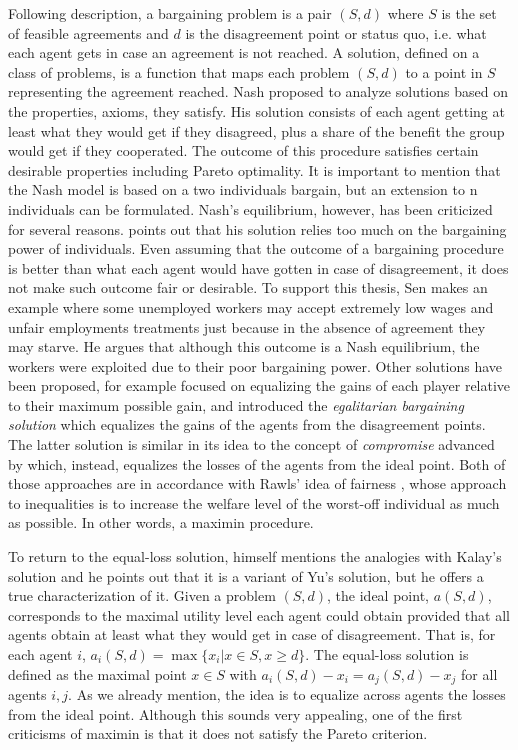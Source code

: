 Following \citet{Nash1950} description, a bargaining problem is a pair $(S,d)$ where $S$ is the set of feasible agreements and $d$ is the disagreement point or status quo, i.e. what each agent gets in case an agreement is not reached. A solution, defined on a class of problems, is a function that maps each problem $(S,d)$ to a point in $S$ representing the agreement reached.
Nash proposed to analyze solutions based on the properties, axioms, they satisfy. His solution consists of each agent getting at least what they would get if they disagreed, plus a share of the benefit the group would get if they cooperated. The outcome of this procedure satisfies certain desirable properties including Pareto optimality. It is important to mention that the Nash model is based on a two individuals bargain, but an extension to n individuals can be formulated. Nash's equilibrium, however, has been criticized for several reasons. \citet[177-180]{Sen2017} points out that his solution relies too much on the bargaining power of individuals.
Even assuming that the outcome of a bargaining procedure is better than what each agent would have gotten in case of disagreement, it does not make such outcome fair or desirable. To support this thesis, Sen makes an example where some unemployed workers may accept extremely low wages and unfair employments treatments just because in the absence of agreement they may starve. He argues that although this outcome is a Nash equilibrium, the workers were exploited due to their poor bargaining power.
Other solutions have been proposed, for example \citet{Kalai1975} focused on equalizing the gains of each player relative to their maximum possible gain, and \citet{Kalai1977} introduced the \textit{egalitarian bargaining solution} which equalizes the gains of the agents from the disagreement points. 
The latter solution is similar in its idea to the concept of \textit{compromise} advanced by \citet{Yu1973} which, instead, equalizes the losses of the agents from the ideal point.
Both of those approaches are in accordance with Rawls' idea of fairness \citep{Rawls1958,Rawls1967}, whose approach to inequalities is to increase the welfare level of the worst-off individual as much as possible. In other words, a maximin procedure.

To return to the equal-loss solution, \citet{Chun1988} himself mentions the analogies with Kalay's solution and he points out that it is a variant of Yu's solution, but he offers a true characterization of it.
Given a problem $(S,d)$, the ideal point, $a(S,d)$, corresponds to the maximal utility level each agent could obtain provided that all agents obtain at least what they would get in case of disagreement. That is, for each agent $i$, $a_i(S,d)=\max\{x_i|x\in S, x\geq d\}$.
The equal-loss solution is defined as the maximal point $x\in S$ with $a_i(S,d)-x_i=a_j(S,d)-x_j$ for all agents $i, j$. As we already mention, the idea is to equalize across agents the losses from the ideal point.
Although this sounds very appealing, one of the first criticisms of maximin is that it does not satisfy the Pareto criterion. 

